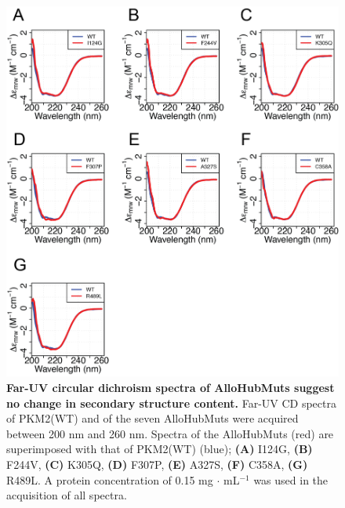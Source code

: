 \begin{figure}[!ht]
\includegraphics[scale=0.8]{ch7_fig2_far_UV_CD.png}
\caption[Far-UV circular dichroism spectra of AlloHubMuts suggest no change in secondary structure content.] {\textbf{Far-UV circular dichroism spectra of AlloHubMuts suggest no change in secondary structure content.} Far-UV CD spectra of PKM2(WT) and of the seven AlloHubMuts were acquired between 200 nm and 260 nm. Spectra of the AlloHubMuts (red) are superimposed with that of PKM2(WT) (blue); \textbf{(A)} I124G, \textbf{(B)} F244V, \textbf{(C)} K305Q, \textbf{(D)} F307P, \textbf{(E)} A327S, \textbf{(F)} C358A, \textbf{(G)} R489L. A protein concentration of 0.15 mg $\cdot$ mL$^{-1}$ was used in the acquisition of all spectra.}
\label{fig:far_uv_cd}
\end{figure}
%
%
\clearpage

